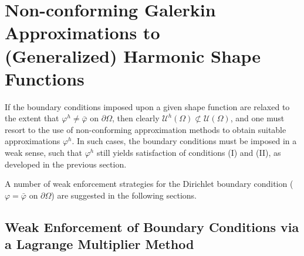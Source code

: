 \section{Non-conforming Galerkin Approximations to \\ (Generalized) Harmonic Shape Functions} \label{sec:nonconforming}

	If the boundary conditions imposed upon a given shape function are relaxed to the extent that $\varphi^h \neq \bar{\varphi}$ on $\partial \Omega$, then clearly $\mathcal{U}^h (\Omega) \not\subset \mathcal{U} (\Omega)$, and one must resort to the use of non-conforming approximation methods to obtain suitable approximations $\varphi^h$. In such cases, the boundary conditions must be imposed in a weak sense, such that $\varphi^h$ still yields satisfaction of conditions (I) and (II), as developed in the previous section.
	
	A number of weak enforcement strategies for the Dirichlet boundary condition ($\varphi = \bar{\varphi}$ on $\partial \Omega$) are suggested in the following sections.
	
	\subsection*{Weak Enforcement of Boundary Conditions via a Lagrange Multiplier Method}
	
